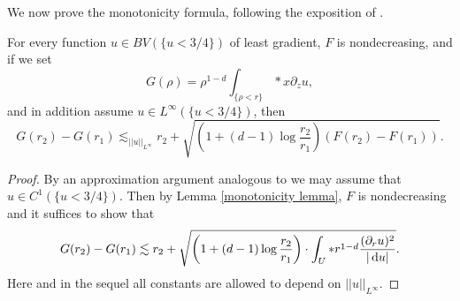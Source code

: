 We now prove the monotonicity formula, following the exposition of \cite[pg71]{Giusti77}.

\begin{proposition}\label{Monotonicity Formula}
For every function $u \in BV(\{u < 3/4\})$ of least gradient, $F$ is nondecreasing, and if we set
$$G(\rho) = \rho^{1 - d} \int_{\{\rho < r\}} *x\partial_zu,$$
and in addition assume $u \in L^\infty(\{u < 3/4\})$, then
\begin{equation}\label{StrongMonotonicity}
G(r_2) - G(r_1) \lesssim_{||u||_{L^\infty}} r_2 + \sqrt{\left(1 + (d - 1)\log \frac{r_2}{r_1}\right)(F(r_2) - F(r_1))}.
\end{equation}
\end{proposition}
\begin{proof}
By an approximation argument analogous to \cite[pg68]{Giusti77} we may assume that $u \in C^1(\{u < 3/4\})$.
Then by Lemma \ref{monotonicity lemma}, $F$ is nondecreasing and it suffices to show that 
\begin{equation}\label{monotonicity wts}
G(r_2) - G(r_1) \lesssim r_2 + \sqrt{\left(1 + (d - 1)\log \frac{r_2}{r_1}\right) \cdot \int_U *r^{1 - d}\frac{(\partial_ru)^2}{|\mathop{}\!\mathrm{d} u|}}.
\end{equation}
Here and in the sequel all constants are allowed to depend on $||u||_{L^\infty}$.


\end{proof}
